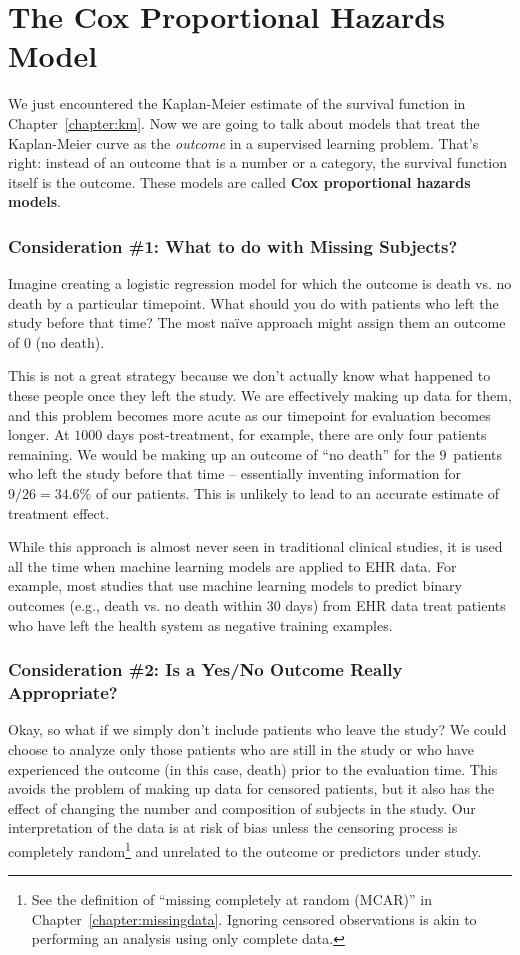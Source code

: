 \chapter{The Cox Proportional Hazards Model \label{chapter:cox}}

We just encountered the Kaplan-Meier estimate of the survival function in Chapter~\ref{chapter:km}. Now we are going to talk about models that treat the Kaplan-Meier curve as the \emph{outcome} in a supervised learning problem. That's right: instead of an outcome that is a number or a category, the survival function itself is the outcome. These models are called \textbf{Cox proportional hazards models}.

\subsection{Consideration \#1: What to do with Missing Subjects?}

Imagine creating a logistic regression model for which the outcome is death vs. no death by a particular timepoint. What should you do with patients who left the study before that time? The most na\"ive approach might assign them an outcome of 0 (no death). 

This is not a great strategy because we don't actually know what happened to these people once they left the study. We are effectively making up data for them, and this problem becomes more acute as our timepoint for evaluation becomes longer. At $1000$ days post-treatment, for example, there are only four patients remaining. We would be making up an outcome of ``no death'' for the $9$~patients who left the study before that time -- essentially inventing information for $9/26 = 34.6$\% of our patients. This is unlikely to lead to an accurate estimate of treatment effect.

While this approach is almost never seen in traditional clinical studies, it is used all the time when machine learning models are applied to EHR data. For example, most studies that use machine learning models to predict binary outcomes (e.g., death vs. no death within 30 days) from EHR data treat patients who have left the health system as negative training examples.

\subsection{Consideration \#2: Is a Yes/No Outcome Really Appropriate?}

Okay, so what if we simply don't include patients who leave the study? We could choose to analyze only those patients who are still in the study or who have experienced the outcome (in this case, death) prior to the evaluation time. This avoids the problem of making up data for censored patients, but it also has the effect of changing the number and composition of subjects in the study. Our interpretation of the data is at risk of bias unless the censoring process is completely random\footnote{See the definition of ``missing completely at random (MCAR)'' in Chapter~\ref{chapter:missingdata}. Ignoring censored observations is akin to performing an analysis using only complete data.} and unrelated to the outcome or predictors under study.

